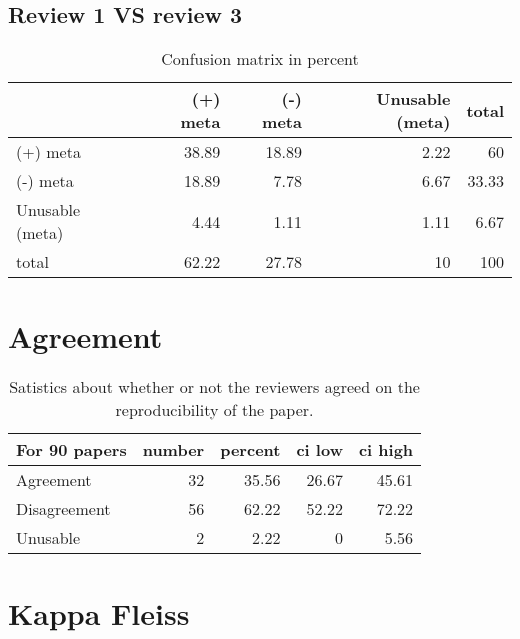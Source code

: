 \documentclass{article}
\begin{document}
\subsection{Review 1 VS review 3} 

\begin{table}[H]

\centering

\begin{tabular}{lrrrr}
\hline
                 &   (+) meta &   (-) meta &   Unusable (meta) &   total \\
\hline
 (+) meta        &      38.89 &      18.89 &              2.22 &   60    \\
 (-) meta        &      18.89 &       7.78 &              6.67 &   33.33 \\
 Unusable (meta) &       4.44 &       1.11 &              1.11 &    6.67 \\
 total           &      62.22 &      27.78 &             10    &  100    \\
\hline
\end{tabular}\caption{Confusion matrix in percent}

\end{table}



\section{Agreement} 

\begin{table}[H]

\centering

\begin{tabular}{lrrrr}
\hline
 For 90 papers   &   number &   percent &   ci low &   ci high \\
\hline
 Agreement       &       32 &     35.56 &    26.67 &     45.61 \\
 Disagreement    &       56 &     62.22 &    52.22 &     72.22 \\
 Unusable        &        2 &      2.22 &     0    &      5.56 \\
\hline
\end{tabular}\caption{Satistics about whether or not the reviewers agreed on the reproducibility of the paper.}

\end{table}



\section{Kappa Fleiss} 
\end{document}
